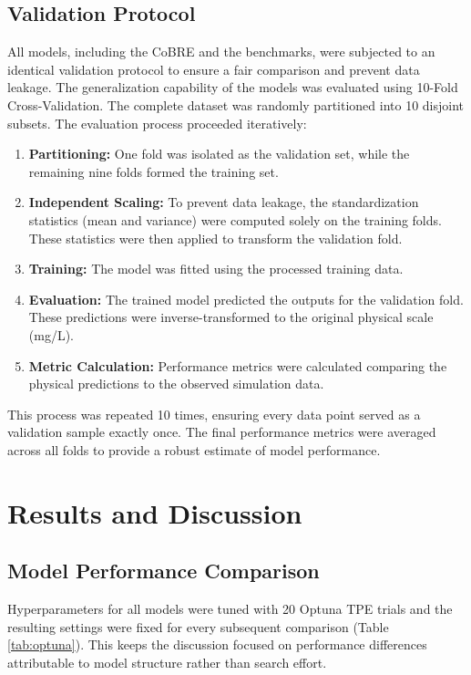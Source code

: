 \documentclass{article}
\begin{document}
\subsection{Validation Protocol}
All models, including the CoBRE and the benchmarks, were subjected to an identical validation protocol to ensure a fair comparison and prevent data leakage. The generalization capability of the models was evaluated using 10-Fold Cross-Validation. The complete dataset was randomly partitioned into 10 disjoint subsets. The evaluation process proceeded iteratively:
\begin{enumerate}
    \item \textbf{Partitioning:} One fold was isolated as the validation set, while the remaining nine folds formed the training set.
    \item \textbf{Independent Scaling:} To prevent data leakage, the standardization statistics (mean and variance) were computed solely on the training folds. These statistics were then applied to transform the validation fold.
    \item \textbf{Training:} The model was fitted using the processed training data.
    \item \textbf{Evaluation:} The trained model predicted the outputs for the validation fold. These predictions were inverse-transformed to the original physical scale (mg/L).
    \item \textbf{Metric Calculation:} Performance metrics were calculated comparing the physical predictions to the observed simulation data.
\end{enumerate}

This process was repeated 10 times, ensuring every data point served as a validation sample exactly once. The final performance metrics were averaged across all folds to provide a robust estimate of model performance. 

\section{Results and Discussion}

\subsection{Model Performance Comparison}

Hyperparameters for all models were tuned with 20 Optuna TPE trials and the resulting settings were fixed for every subsequent comparison (Table \ref{tab:optuna}). This keeps the discussion focused on performance differences attributable to model structure rather than search effort.
\end{document}
